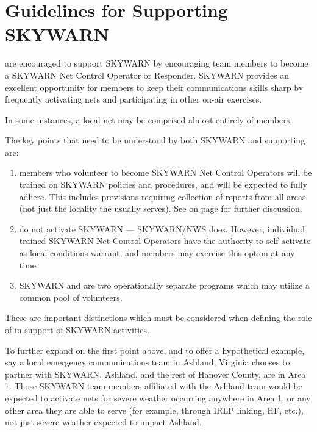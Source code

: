 \documentclass[pdflatex,letterpaper,twoside,12pt]{book}
\begin{document}

\section{Guidelines for \tpteams Supporting SKYWARN}


\tpteams are encouraged to support SKYWARN by encouraging team members to become a SKYWARN Net Control Operator or Responder.  SKYWARN provides an excellent opportunity for \tpteam members to keep their communications skills sharp by frequently activating nets and participating in other on-air exercises.

In some instances, a local net may be comprised almost entirely of \tpteam members.

The key points that need to be understood by both SKYWARN and supporting \tpteams are:

\begin{enumerate}
\item \tpteam members who volunteer to become SKYWARN Net Control Operators will be trained on SKYWARN policies and procedures, and will be expected to fully adhere.  This includes provisions requiring collection of reports from all areas (not just the locality the \tpteam usually serves).  See  on page \pageref{sponsorship-of-nets} for further discussion.
\item  \tpteams do not activate SKYWARN --- SKYWARN/NWS does.  However, individual trained SKYWARN Net Control Operators have the authority to self-activate as local conditions warrant, and \tpteam members may exercise this option at any time.
\item  SKYWARN and \tpteams are two operationally separate programs which may utilize a common pool of volunteers.
\end{enumerate}

These are important distinctions which must be considered when defining the role of \tpteams in support of SKYWARN activities.

To further expand on the first point above, and to offer a hypothetical example, say a local emergency communications team in Ashland, Virginia chooses to partner with SKYWARN.  Ashland, and the rest of Hanover County, are in Area 1.  Those SKYWARN team members affiliated with the Ashland team would be expected to activate nets for severe weather occurring anywhere in Area 1, or any other area they are able to serve (for example, through IRLP linking, HF, etc.), not just severe weather expected to impact Ashland.
\end{document}
